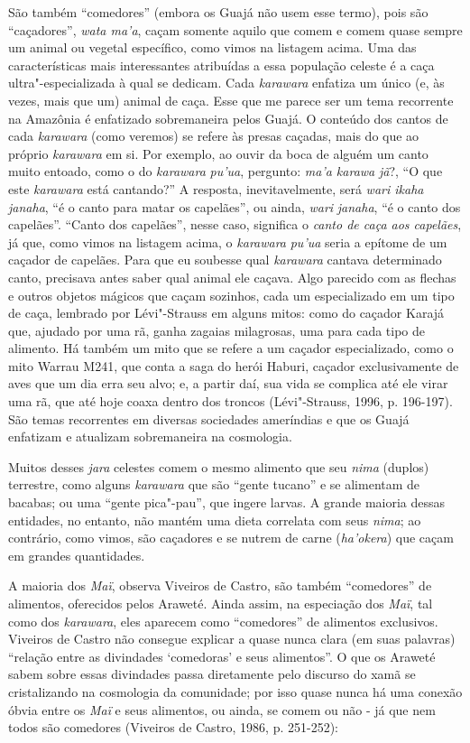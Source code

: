 São também ``comedores'' (embora os Guajá não usem esse termo), pois são
``caçadores'', \emph{wata ma'a}, caçam somente aquilo que comem e comem
quase sempre um animal ou vegetal específico, como vimos na listagem
acima. Uma das características mais interessantes atribuídas a essa
população celeste é a caça ultra"-especializada à qual se dedicam. Cada
\emph{karawara} enfatiza um único (e, às vezes, mais que um) animal de
caça. Esse que me parece ser um tema recorrente na Amazônia é enfatizado
sobremaneira pelos Guajá. O conteúdo dos cantos de cada \emph{karawara}
(como veremos) se refere às presas caçadas, mais do que ao próprio
\emph{karawara} em si. Por exemplo, ao ouvir da boca de alguém um canto
muito entoado, como o do \emph{karawara} \emph{pu'ua}, pergunto:
\emph{ma'a karawa} \emph{jã}?, ``O que este \emph{karawara} está
cantando?'' A resposta, inevitavelmente, será \emph{wari ikaha}
\emph{janaha}, ``é o canto para matar os capelães'', ou ainda, \emph{wari}
\emph{janaha}, ``é o canto dos capelães''. ``Canto dos capelães'', nesse
caso, significa o \emph{canto de caça aos capelães}, já que, como vimos
na listagem acima, o \emph{karawara} \emph{pu'ua} seria a epítome de um
caçador de capelães. Para que eu soubesse qual \emph{karawara} cantava
determinado canto, precisava antes saber qual animal ele caçava. Algo
parecido com as flechas e outros objetos mágicos que caçam sozinhos,
cada um especializado em um tipo de caça, lembrado por Lévi"-Strauss em
alguns mitos: como do caçador Karajá que, ajudado por uma rã, ganha
zagaias milagrosas, uma para cada tipo de alimento. Há também um mito
que se refere a um caçador especializado, como o mito Warrau M241, que
conta a saga do herói Haburi, caçador exclusivamente de aves que um dia
erra seu alvo; e, a partir daí, sua vida se complica até ele virar uma
rã, que até hoje coaxa dentro dos troncos (Lévi"-Strauss, 1996, p.
196-197). São temas recorrentes em diversas sociedades ameríndias e que
os Guajá enfatizam e atualizam sobremaneira na cosmologia.

Muitos desses \emph{jara} celestes comem o mesmo alimento que seu
\emph{nima} (duplos) terrestre, como alguns \emph{karawara} que são
``gente tucano'' e se alimentam de bacabas; ou uma ``gente pica"-pau'',
que ingere larvas. A grande maioria dessas entidades, no entanto, não
mantém uma dieta correlata com seus \emph{nima}; ao contrário, como
vimos, são caçadores e se nutrem de carne (\emph{ha'okera}) que caçam em
grandes quantidades.

A maioria dos \emph{Maï}, observa Viveiros de Castro, são também
``comedores'' de alimentos, oferecidos pelos Araweté. Ainda assim, na
especiação dos \emph{Maï}, tal como dos \emph{karawara}, eles aparecem
como ``comedores'' de alimentos exclusivos. Viveiros de Castro não
consegue explicar a quase nunca clara (em suas palavras) ``relação entre
as divindades `comedoras' e seus alimentos''. O que os Araweté sabem
sobre essas divindades passa diretamente pelo discurso do xamã se
cristalizando na cosmologia da comunidade; por isso quase nunca há uma
conexão óbvia entre os \emph{Maï} e seus alimentos, ou ainda, se comem
ou não - já que nem todos são comedores (Viveiros de Castro, 1986, p.
251-252):

